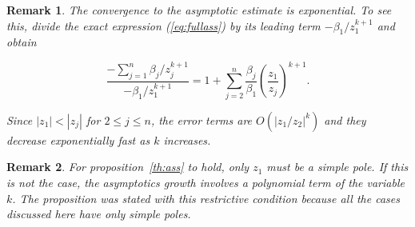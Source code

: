 \documentclass{article}
\newtheorem{remark}{Remark}
\begin{document}
\begin{remark}
The convergence to the asymptotic estimate is exponential. To see this,
divide the exact expression (\ref{eq:fullass}) by its leading term
$-\beta_1/z_1^{k+1}$ and obtain

\begin{equation*}
\frac{-\sum_{j=1}^n \beta_j/z_j^{k+1}}{-\beta_1/z_1^{k+1}} =
1 + \sum_{j=2}^n
\frac{\beta_j}{\beta_1} \left( \frac{z_1}{z_j} \right)^{k+1}.
\end{equation*}

Since $|z_1| < |z_j|$ for $2 \leq j \leq n$, the error terms are
$O(|z_1/z_2|^k)$ and they decrease exponentially fast as $k$ increases.
\end{remark}

\begin{remark}
For proposition~\ref{th:ass} to hold, only $z_1$ must be a simple pole. If
this is not the case, the asymptotics growth involves a polynomial term of
the variable $k$. The proposition was stated with this restrictive
condition because all the cases discussed here have only simple poles.
\end{remark}
\end{document}

